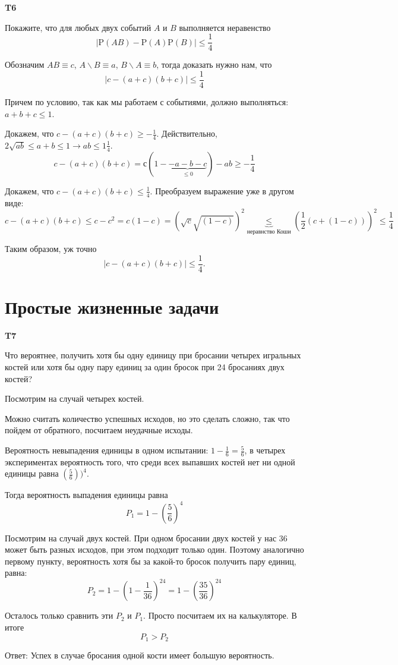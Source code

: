 \documentclass[a4paper,12pt]{article} %
\begin{document}
\begin{example}\textbf{T6}

Покажите, что для любых двух событий $A$ и $B$ выполняется неравенство
$$
|\mathrm{P}(A B)-\mathrm{P}(A) \mathrm{P}(B)| \leq \frac{1}{4}
$$

Обозначим $ A B\equiv c$, $ A\backslash B\equiv a$, $ B\backslash A\equiv b$, тогда доказать нужно нам, что
$$ |c-(a+c)(b+c)|\le \frac{1}{4} $$

Причем по условию, так как мы работаем с событиями, должно выполняться: $ a+b+c\le 1$.

Докажем, что $ c-(a+c)(b+c)\ge -\frac{1}{4}$. Действительно, $ 2\sqrt{ab}\le a+b\le 1 \rightarrow ab\le 1\frac{1}{4}$.
\[ c-(a+c)(b+c)=с(1-\underbrace{-a-b-c}_{\le 0})-ab \ge -\frac{1}{4}\]



Докажем, что $ c-(a+c)(b+c)\le \frac{1}{4}$. Преобразуем выражение уже в другом виде:
\[ c-(a+c)(b+c)\le c-c^2=c(1-c)=(\sqrt{c}\sqrt{(1-c)})^2\underbrace{\le}_{\text{неравнство Коши}}
\left(\frac{1}{2} ( c + ( 1-c ))
\right)^2 \le\frac{1}{4}\]

Таким образом, уж точно
$$ |c-(a+c)(b+c)|\le \frac{1}{4}. $$

\end{example}






\section{Простые жизненные задачи}


\begin{example}\textbf{T7}

Что вероятнее, получить хотя бы одну единицу при бросании четырех игральных костей 
или хотя бы одну пару единиц за один бросок при 24 бросаниях двух костей?

Посмотрим на случай четырех костей.

Можно считать количество успешных исходов, но это сделать сложно, так что пойдем от обратного, посчитаем неудачные исходы.

Вероятность невыпадения единицы в одном испытании: $ 1-\frac{1}{6}=\frac{5}{6}$, в четырех экспериментах вероятность того, что среди всех выпавших костей нет ни одной единицы равна $ \left(\frac{5}{6} \right))^4$. 

Тогда вероятность выпадения единицы равна 
$$P_1= 1- (\frac{5}{6})^4$$


Посмотрим на случай двух костей.
При одном бросании двух костей у нас 36 может быть разных исходов, при этом подходит только один.
Поэтому  аналогично первому пункту, вероятность хотя бы за какой-то бросок получить пару единиц, равна:
$$P_2= 1-(1-\frac{1}{36})^{24}=1-\left(\frac{35}{36} \right)^{24} $$

Осталось только сравнить эти $ P_2$ и $ P_1$. Просто посчитаем их на калькуляторе. В итоге 
\[ P_1> P_2 \]


Ответ: Успех в случае бросания одной кости имеет большую вероятность.


\end{example}
\end{document}
